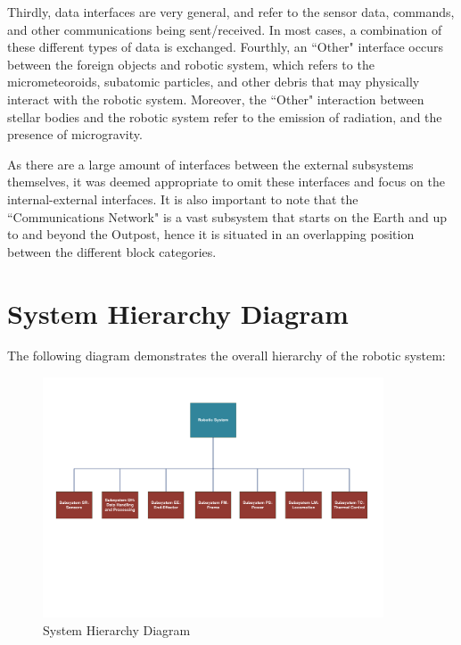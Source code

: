 \documentclass[12pt, letterpaper]{article}
\begin{document}
\vspace*{3pt}
Thirdly, data interfaces are very general, and refer to the sensor data, commands, and other communications being sent/received. In most cases, a combination of these different types of data is exchanged. Fourthly, an ``Other" interface occurs between the foreign objects and robotic system, which refers to the micrometeoroids, subatomic particles, and other debris that may physically interact with the robotic system. Moreover, the ``Other" interaction between stellar bodies and the robotic system refer to the emission of radiation, and the presence of microgravity.

\vspace*{3pt}
As there are a large amount of interfaces between the external subsystems themselves, it was deemed appropriate to omit these interfaces and focus on the internal-external interfaces. It is also important to note that the ``Communications Network" is a vast subsystem that starts on the Earth and up to and beyond the Outpost, hence it is situated in an overlapping position between the different block categories.

\section{System Hierarchy Diagram}
\label{sect:SHD}
The following diagram demonstrates the overall hierarchy of the robotic system:
\begin{figure}[H]
\label{fig:SHD}
\centering
\includegraphics[width=0.9\textwidth]{SHD}
\caption{System Hierarchy Diagram}
\end{figure}
\end{document}
